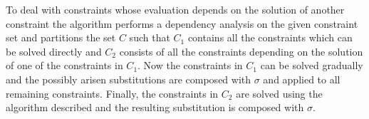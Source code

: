To deal with constraints whose evaluation depends on the solution
of another constraint the algorithm performs a dependency analysis on
the given constraint set and partitions the set $C$ such that $C_1$
contains all the constraints which can be solved directly and $C_2$
consists of all the constraints depending on the solution of one of
the constraints in $C_1$. Now the constraints in $C_1$ can be solved
gradually and the possibly arisen substitutions are composed with
$\sigma$ and applied to all remaining constraints. Finally, the
constraints in $C_2$ are solved using the algorithm described and the
resulting substitution is composed with $\sigma$.

